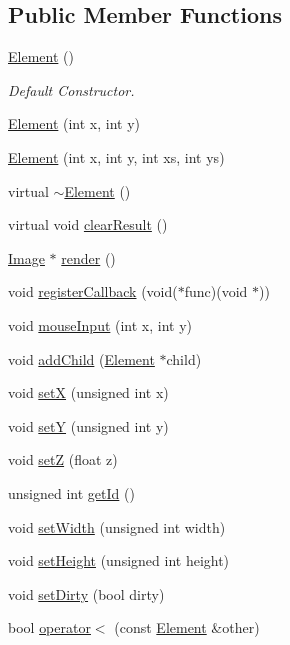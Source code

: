 \subsection*{Public Member Functions}
\begin{DoxyCompactItemize}
\item 
\hyperlink{class_element_ab0d0e20be9a36ae676202db753faeec9}{Element} ()
\begin{DoxyCompactList}\small\item\em Default Constructor. \end{DoxyCompactList}\item 
\hyperlink{class_element_ae385b104c66f092731777d70775b7f55}{Element} (int x, int y)
\item 
\hyperlink{class_element_aabaef3fcc0959ea3c5b43f59522d0a1e}{Element} (int x, int y, int xs, int ys)
\item 
virtual \hyperlink{class_element_a13d54ba9c08b6bec651402f1c2bb002c}{$\sim$\-Element} ()
\item 
virtual void \hyperlink{class_element_a5a35a40d6797bf8b6ebe1b76090244fd}{clear\-Result} ()
\item 
\hyperlink{class_image}{Image} $\ast$ \hyperlink{class_element_a2410f72a9b5abcf43641ef1b9e50f646}{render} ()
\item 
void \hyperlink{class_element_af3291346742556571a5c8578d2fc7026}{register\-Callback} (void($\ast$func)(void $\ast$))
\item 
void \hyperlink{class_element_aa1a3a8de669ecc840d2f2fb1e338300f}{mouse\-Input} (int x, int y)
\item 
void \hyperlink{class_element_a5e5de37f6b79a3a952d021ba15b3912d}{add\-Child} (\hyperlink{class_element}{Element} $\ast$child)
\item 
void \hyperlink{class_element_ae222484e55d330ddfd7869510b10ec09}{set\-X} (unsigned int x)
\item 
void \hyperlink{class_element_a95ea0342571b8521028b8321ba915227}{set\-Y} (unsigned int y)
\item 
void \hyperlink{class_element_aab1f2476247f365f6755dc2913d205b3}{set\-Z} (float z)
\item 
unsigned int \hyperlink{class_element_a4d41f5af2e3e5787945915a3b803131a}{get\-Id} ()
\item 
void \hyperlink{class_element_a185f979ca317ede0dd270c7940b2a0a2}{set\-Width} (unsigned int width)
\item 
void \hyperlink{class_element_aa3aaacaf56fb94deaa14f6b0d172ab65}{set\-Height} (unsigned int height)
\item 
void \hyperlink{class_element_aee4a1536e9e19eec9970522bb664550d}{set\-Dirty} (bool dirty)
\item 
bool \hyperlink{class_element_aa931ea96e0f488ffe00b7bef715ef24c}{operator$<$} (const \hyperlink{class_element}{Element} \&other)
\end{DoxyCompactItemize}
